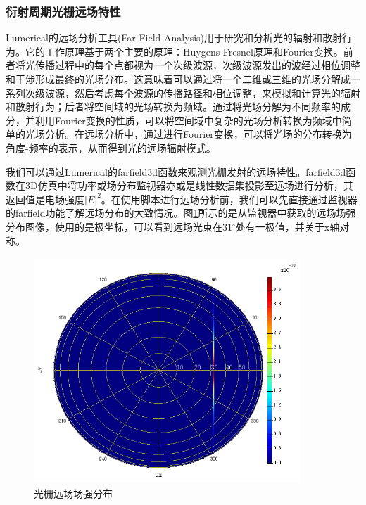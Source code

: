 \documentclass[UTF8,a4paper,12pt]{ctexart}
\numberwithin{equation}{section}
\begin{document}
\subsubsection{衍射周期光栅远场特性}
Lumerical的远场分析工具(Far Field Analysis)用于研究和分析光的辐射和散射行为。它的工作原理基于两个主要的原理：Huygens-Fresnel原理和Fourier变换。前者将光传播过程中的每个点都视为一个次级波源，次级波源发出的波经过相位调整和干涉形成最终的光场分布。这意味着可以通过将一个二维或三维的光场分解成一系列次级波源，然后考虑每个波源的传播路径和相位调整，来模拟和计算光的辐射和散射行为；后者将空间域的光场转换为频域。通过将光场分解为不同频率的成分，并利用Fourier变换的性质，可以将空间域中复杂的光场分析转换为频域中简单的光场分析。在远场分析中，通过进行Fourier变换，可以将光场的分布转换为角度-频率的表示，从而得到光的远场辐射模式。

我们可以通过Lumerical的farfield3d函数来观测光栅发射的远场特性。farfield3d函数在3D仿真中将功率或场分布监视器亦或是线性数据集投影至远场进行分析，其返回值是电场强度$|E|^2$。在使用脚本进行远场分析前，我们可以先直接通过监视器的farfield功能了解远场分布的大致情况。图\ref{3-10}所示的是从监视器中获取的远场场强分布图像，使用的是极坐标，可以看到远场光束在31$^\circ$处有一极值，并关于x轴对称。
\begin{figure}[htbp]
\centering
\includegraphics[height=8.5cm,width=10cm]{fig16.png}
\caption{光栅远场场强分布}
\label{3-10}
\end{figure}
\end{document}
